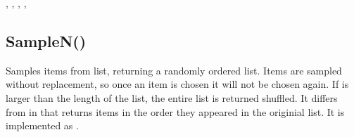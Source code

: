 \documentclass[letterpaper,10pt,english]{sphinxmanual}
\begin{document}
\sphinxAtStartPar
{}

\sphinxAtStartPar
{}, , , , 

\ignorespaces 

\subsection{SampleN()}
\label{\detokenize{reference/design:samplen}}\label{\detokenize{reference/design:index-16}}
\sphinxAtStartPar
{}

\sphinxAtStartPar
Samples  items from list, returning   a randomly\sphinxhyphen{} ordered list. Items are sampled without replacement, so   once an item is chosen it will not be chosen again. If    is larger than the length of the list, the entire   list is returned shuffled.  It differs from  in that    returns items in the order they appeared in the   originial list.  It is implemented as .

\sphinxAtStartPar
{}

\begin{sphinxVerbatim}[commandchars=\\\{\}]
\end{sphinxVerbatim}

\sphinxAtStartPar
{}

\begin{sphinxVerbatim}[commandchars=\\\{\}]
\PYG{p}{[}\PYG{p}{]}
\PYG{p}{[}\PYG{p}{]}
\end{sphinxVerbatim}
\end{document}
